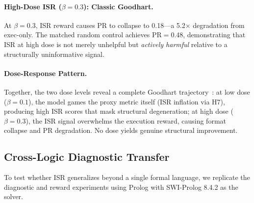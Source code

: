\paragraph{High-Dose ISR ($\beta{=}0.3$): Classic Goodhart.}
At $\beta{=}0.3$, ISR reward causes PR to collapse to 0.18---a 5.2$\times$ degradation from exec-only. The matched random control achieves PR$=$0.48, demonstrating that ISR at high dose is not merely unhelpful but \emph{actively harmful} relative to a structurally uninformative signal.

\paragraph{Dose-Response Pattern.}
Together, the two dose levels reveal a complete Goodhart trajectory~\cite{karwowski-goodhart-rl}: at low dose ($\beta{=}0.1$), the model games the proxy metric itself (ISR inflation via H7), producing high ISR scores that mask structural degeneration; at high dose ($\beta{=}0.3$), the ISR signal overwhelms the execution reward, causing format collapse and PR degradation. No dose yields genuine structural improvement.

\subsection{Cross-Logic Diagnostic Transfer}
\label{sec:crosslogic}

To test whether ISR generalizes beyond a single formal language, we replicate the diagnostic and reward experiments using Prolog with SWI-Prolog 8.4.2 as the solver.

